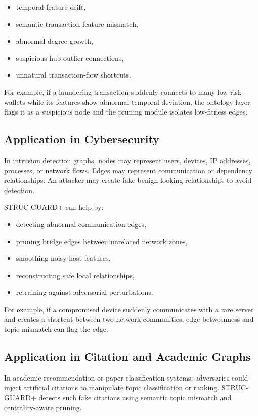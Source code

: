 \documentclass[12pt,a4paper]{article}
\begin{document}
\begin{itemize}
    \item temporal feature drift,
    \item semantic transaction-feature mismatch,
    \item abnormal degree growth,
    \item suspicious hub-outlier connections,
    \item unnatural transaction-flow shortcuts.
\end{itemize}

For example, if a laundering transaction suddenly connects to many low-risk wallets while its features show abnormal temporal deviation, the ontology layer flags it as a suspicious node and the pruning module isolates low-fitness edges.

\subsection{Application in Cybersecurity}
In intrusion detection graphs, nodes may represent users, devices, IP addresses, processes, or network flows. Edges may represent communication or dependency relationships. An attacker may create fake benign-looking relationships to avoid detection.

STRUC-GUARD+ can help by:

\begin{itemize}
    \item detecting abnormal communication edges,
    \item pruning bridge edges between unrelated network zones,
    \item smoothing noisy host features,
    \item reconstructing safe local relationships,
    \item retraining against adversarial perturbations.
\end{itemize}

For example, if a compromised device suddenly communicates with a rare server and creates a shortcut between two network communities, edge betweenness and topic mismatch can flag the edge.

\subsection{Application in Citation and Academic Graphs}
In academic recommendation or paper classification systems, adversaries could inject artificial citations to manipulate topic classification or ranking. STRUC-GUARD+ detects such fake citations using semantic topic mismatch and centrality-aware pruning.
\end{document}
